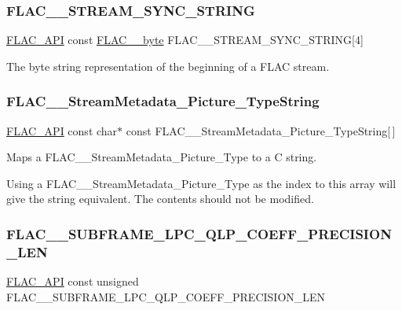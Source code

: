 \subsubsection{\texorpdfstring{FLAC\_\_STREAM\_SYNC\_STRING}{FLAC\_\_STREAM\_SYNC\_STRING}}
{\footnotesize\ttfamily \mbox{\hyperlink{group__flac__export_ga56ca07df8a23310707732b1c0007d6f5}{F\+L\+A\+C\+\_\+\+A\+PI}} const \mbox{\hyperlink{ordinals_8h_a5eb569b12d5b047cdacada4d57924ee3}{F\+L\+A\+C\+\_\+\+\_\+byte}} F\+L\+A\+C\+\_\+\+\_\+\+S\+T\+R\+E\+A\+M\+\_\+\+S\+Y\+N\+C\+\_\+\+S\+T\+R\+I\+NG\mbox{[}4\mbox{]}}

The byte string representation of the beginning of a F\+L\+AC stream. \mbox{\label{group__flac__format_gaddee484e4ef594f23402072a950e00fd}} 
\subsubsection{\texorpdfstring{FLAC\_\_StreamMetadata\_Picture\_TypeString}{FLAC\_\_StreamMetadata\_Picture\_TypeString}}
{\footnotesize\ttfamily \mbox{\hyperlink{group__flac__export_ga56ca07df8a23310707732b1c0007d6f5}{F\+L\+A\+C\+\_\+\+A\+PI}} const char$\ast$ const F\+L\+A\+C\+\_\+\+\_\+\+Stream\+Metadata\+\_\+\+Picture\+\_\+\+Type\+String\mbox{[}$\,$\mbox{]}}

Maps a F\+L\+A\+C\+\_\+\+\_\+\+Stream\+Metadata\+\_\+\+Picture\+\_\+\+Type to a C string.

Using a F\+L\+A\+C\+\_\+\+\_\+\+Stream\+Metadata\+\_\+\+Picture\+\_\+\+Type as the index to this array will give the string equivalent. The contents should not be modified. \mbox{\label{group__flac__format_ga1d983d775b492e968719457694737116}} 
\subsubsection{\texorpdfstring{FLAC\_\_SUBFRAME\_LPC\_QLP\_COEFF\_PRECISION\_LEN}{FLAC\_\_SUBFRAME\_LPC\_QLP\_COEFF\_PRECISION\_LEN}}
{\footnotesize\ttfamily \mbox{\hyperlink{group__flac__export_ga56ca07df8a23310707732b1c0007d6f5}{F\+L\+A\+C\+\_\+\+A\+PI}} const unsigned F\+L\+A\+C\+\_\+\+\_\+\+S\+U\+B\+F\+R\+A\+M\+E\+\_\+\+L\+P\+C\+\_\+\+Q\+L\+P\+\_\+\+C\+O\+E\+F\+F\+\_\+\+P\+R\+E\+C\+I\+S\+I\+O\+N\+\_\+\+L\+EN}


